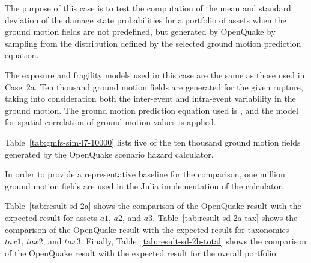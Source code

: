 The purpose of this case is to test the computation of the mean and standard deviation of the damage state probabilities for a portfolio of assets when the ground motion fields are not predefined, but generated by OpenQuake by sampling from the distribution defined by the selected ground motion prediction equation.

The exposure and fragility models used in this case are the same as those used in Case~2a. Ten thousand ground motion fields are generated for the given rupture, taking into consideration both the inter-event and intra-event variability in the ground motion. The ground motion prediction equation used is \citet{boore2008}, and the \citet{jayaram2009} model for spatial correlation of ground motion values is applied.

Table~\ref{tab:gmfs-sim-l7-10000} lists five of the ten thousand ground motion fields generated by the OpenQuake scenario hazard calculator.

In order to provide a representative baseline for the comparison, one million ground motion fields are used in the Julia implementation of the calculator.





Table~\ref{tab:result-sd-2a} shows the comparison of the OpenQuake result with the expected result for assets $a1$, $a2$, and $a3$. Table~\ref{tab:result-sd-2a-tax} shows the comparison of the OpenQuake result with the expected result for taxonomies $tax1$, $tax2$, and $tax3$. Finally, Table~\ref{tab:result-sd-2b-total} shows the comparison of the OpenQuake result with the expected result for the overall portfolio.